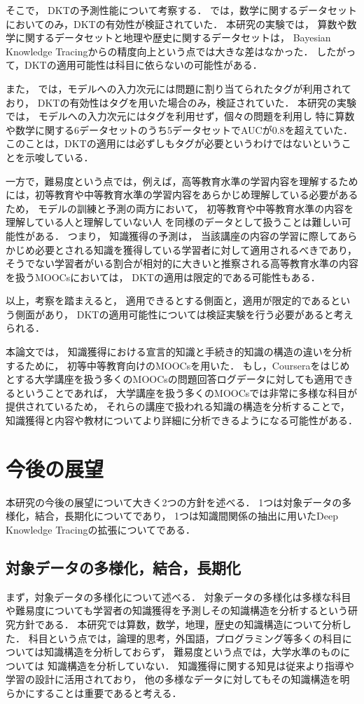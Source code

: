 そこで，
DKTの予測性能について考察する．
\cite{piech2015deep}では，数学に関するデータセットにおいてのみ，DKTの有効性が検証されていた．
本研究の実験では，
算数や数学に関するデータセットと地理や歴史に関するデータセットは，
Bayesian Knowledge Tracingからの精度向上という点では大きな差はなかった．
したがって，DKTの適用可能性は科目に依らないの可能性がある．

また，
\cite{piech2015deep}では，モデルへの入力次元には問題に割り当てられたタグが利用されており，
DKTの有効性はタグを用いた場合のみ，検証されていた．
本研究の実験では，
モデルへの入力次元にはタグを利用せず，個々の問題を利用し
特に算数や数学に関する6データセットのうち5データセットでAUCが$0.8$を超えていた．
このことは，DKTの適用には必ずしもタグが必要というわけではないということを示唆している．

一方で，難易度という点では，例えば，高等教育水準の学習内容を理解するためには，初等教育や中等教育水準の学習内容をあらかじめ理解している必要があるため，
モデルの訓練と予測の両方において，
初等教育や中等教育水準の内容を理解している人と理解していない人
を同様のデータとして扱うことは難しい可能性がある．
つまり，
知識獲得の予測は，
当該講座の内容の学習に際してあらかじめ必要とされる知識を獲得している学習者に対して適用されるべきであり，
そうでない学習者がいる割合が相対的に大きいと推察される高等教育水準の内容を扱うMOOCsにおいては，
DKTの適用は限定的である可能性もある．


以上，考察を踏まえると，
適用できるとする側面と，適用が限定的であるという側面があり，
DKTの適用可能性については検証実験を行う必要があると考えられる．

本論文では，
知識獲得における宣言的知識と手続き的知識の構造の違いを分析するために，
初等中等教育向けのMOOCsを用いた．
もし，Courseraをはじめとする大学講座を扱う多くのMOOCsの問題回答ログデータに対しても適用できるということであれば，
大学講座を扱う多くのMOOCsでは非常に多様な科目が提供されているため，
それらの講座で扱われる知識の構造を分析することで，
知識獲得と内容や教材についてより詳細に分析できるようになる可能性がある．




\section{今後の展望}
本研究の今後の展望について大きく2つの方針を述べる．
1つは対象データの多様化，結合，長期化についてであり，
1つは知識間関係の抽出に用いたDeep Knowledge Tracingの拡張についてである．

\subsection{対象データの多様化，結合，長期化}
まず，対象データの多様化について述べる．
対象データの多様化は多様な科目や難易度についても学習者の知識獲得を予測しその知識構造を分析するという研究方針である．
本研究では算数，数学，地理，歴史の知識構造について分析した．
科目という点では，論理的思考，外国語，プログラミング等多くの科目については知識構造を分析しておらず，
難易度という点では，大学水準のものについては
知識構造を分析していない．
知識獲得に関する知見は従来より指導や学習の設計に活用されており，
他の多様なデータに対してもその知識構造を明らかにすることは重要であると考える．


